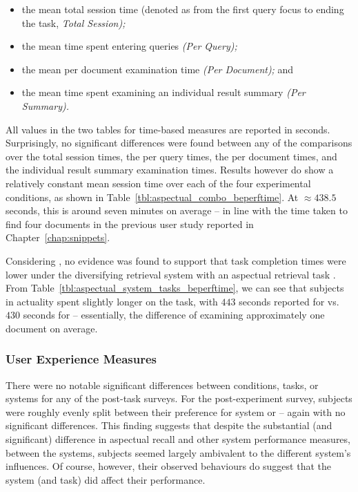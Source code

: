 \begin{itemize}
    \item{the mean total session time (denoted as from the first query focus to ending the task, \emph{Total Session);}}
    \item{the mean time spent entering queries \emph{(Per Query);}}
    \item{the mean per document examination time \emph{(Per Document);} and}
    \item{the mean time spent examining an individual result summary \emph{(Per Summary).}}
\end{itemize}

All values in the two tables for time-based measures are reported in seconds. Surprisingly, no significant differences were found between any of the comparisons over the total session times, the per query times, the per document times, and the individual result summary examination times. Results however do show a relatively constant mean session time over each of the four experimental conditions, as shown in Table~\ref{tbl:aspectual_combo_beperftime}. At $\approx 438.5$ seconds, this is around seven minutes on average -- in line with the time taken to find four documents in the previous user study reported in Chapter~\ref{chap:snippets}.

Considering , no evidence was found to support that task completion times were lower under the diversifying retrieval system with an aspectual retrieval task . From Table~\ref{tbl:aspectual_system_tasks_beperftime}, we can see that subjects in actuality spent slightly longer on the task, with $443$ seconds reported for  vs. $430$ seconds for  -- essentially, the difference of examining approximately one document on average.

\subsubsection{User Experience Measures}\label{sec:diversity:users:results:experience}
There were no notable significant differences between conditions, tasks, or systems for any of the post-task surveys. For the post-experiment survey, subjects were roughly evenly split between their preference for system  or  -- again with no significant differences. This finding suggests that despite the substantial (and significant) difference in aspectual recall and other system performance measures, between the systems, subjects seemed largely ambivalent to the different system's influences. Of course, however, their observed behaviours do suggest that the system (and task) did affect their performance.

